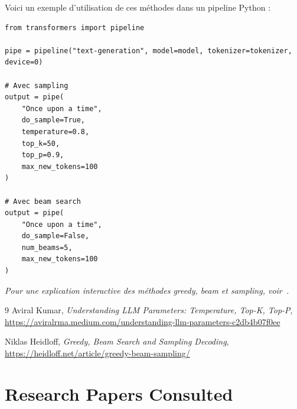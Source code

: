 \documentclass[a4paper,11pt]{article}
\begin{document}
Voici un exemple d’utilisation de ces méthodes dans un pipeline Python :

\begin{verbatim}
from transformers import pipeline

pipe = pipeline("text-generation", model=model, tokenizer=tokenizer, device=0)

# Avec sampling
output = pipe(
    "Once upon a time",
    do_sample=True,
    temperature=0.8,
    top_k=50,
    top_p=0.9,
    max_new_tokens=100
)

# Avec beam search
output = pipe(
    "Once upon a time",
    do_sample=False,
    num_beams=5,
    max_new_tokens=100
)
\end{verbatim}

\textit{Pour une explication interactive des méthodes greedy, beam et sampling, voir~\cite{heidloff_decoding}.}

\vspace{1em}

\begin{thebibliography}{9}
Aviral Kumar,
\textit{Understanding LLM Parameters: Temperature, Top-K, Top-P},
\href{https://aviralrma.medium.com/understanding-llm-parameters-c2db4b07f0ee}{https://aviralrma.medium.com/understanding-llm-parameters-c2db4b07f0ee}

Niklas Heidloff,
\textit{Greedy, Beam Search and Sampling Decoding},
\href{https://heidloff.net/article/greedy-beam-sampling/}{https://heidloff.net/article/greedy-beam-sampling/}
\end{thebibliography}

\section{Research Papers Consulted}
\end{document}
